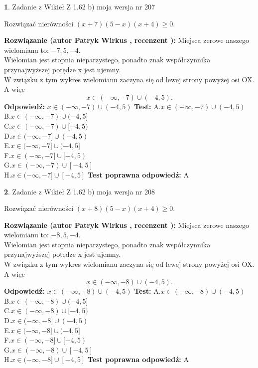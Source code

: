 \documentclass[12pt, a4paper]{article}
\theoremstyle{definition} %
\newtheorem{zad}{}
\newcommand{\zadStart}[1]{\begin{zad}#1\newline}
\newcommand{\zadStop}{\end{zad}}
\newcommand{\rozwStart}[2]{\noindent \textbf{Rozwiązanie (autor #1 , recenzent #2): }\newline}
\newcommand{\rozwStop}{\newline}
\newcommand{\odpStart}{\noindent \textbf{Odpowiedź:}\newline}
\newcommand{\odpStop}{\newline}
\newcommand{\testStart}{\noindent \textbf{Test:}\newline}
\newcommand{\testStop}{\newline}
\newcommand{\kluczStart}{\noindent \textbf{Test poprawna odpowiedź:}\newline}
\newcommand{\kluczStop}{\newline}
\begin{document}
\zadStart{Zadanie z Wikieł Z 1.62 b) moja wersja nr 207}

Rozwiązać nierówności $(x+7)(5-x)(x+4)\ge0$.
\zadStop
\rozwStart{Patryk Wirkus}{}
Miejsca zerowe naszego wielomianu to: $-7, 5, -4$.\\
Wielomian jest stopnia nieparzystego, ponadto znak współczynnika przy\linebreak najwyższej potędze x jest ujemny.\\ W związku z tym wykres wielomianu zaczyna się od lewej strony powyżej osi OX. A więc $$x \in (-\infty,-7) \cup (-4,5).$$
\rozwStop
\odpStart
$x \in (-\infty,-7) \cup (-4,5)$
\odpStop
\testStart
A.$x \in (-\infty,-7) \cup (-4,5)$\\
B.$x \in (-\infty,-7) \cup (-4,5]$\\
C.$x \in (-\infty,-7) \cup [-4,5)$\\
D.$x \in (-\infty,-7] \cup (-4,5)$\\
E.$x \in (-\infty,-7] \cup (-4,5]$\\
F.$x \in (-\infty,-7] \cup [-4,5)$\\
G.$x \in (-\infty,-7) \cup [-4,5]$\\
H.$x \in (-\infty,-7] \cup [-4,5]$
\testStop
\kluczStart
A
\kluczStop



\zadStart{Zadanie z Wikieł Z 1.62 b) moja wersja nr 208}

Rozwiązać nierówności $(x+8)(5-x)(x+4)\ge0$.
\zadStop
\rozwStart{Patryk Wirkus}{}
Miejsca zerowe naszego wielomianu to: $-8, 5, -4$.\\
Wielomian jest stopnia nieparzystego, ponadto znak współczynnika przy\linebreak najwyższej potędze x jest ujemny.\\ W związku z tym wykres wielomianu zaczyna się od lewej strony powyżej osi OX. A więc $$x \in (-\infty,-8) \cup (-4,5).$$
\rozwStop
\odpStart
$x \in (-\infty,-8) \cup (-4,5)$
\odpStop
\testStart
A.$x \in (-\infty,-8) \cup (-4,5)$\\
B.$x \in (-\infty,-8) \cup (-4,5]$\\
C.$x \in (-\infty,-8) \cup [-4,5)$\\
D.$x \in (-\infty,-8] \cup (-4,5)$\\
E.$x \in (-\infty,-8] \cup (-4,5]$\\
F.$x \in (-\infty,-8] \cup [-4,5)$\\
G.$x \in (-\infty,-8) \cup [-4,5]$\\
H.$x \in (-\infty,-8] \cup [-4,5]$
\testStop
\kluczStart
A
\kluczStop
\end{document}
